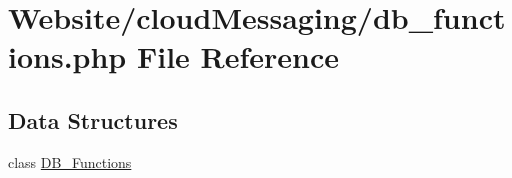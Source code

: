\hypertarget{db__functions_8php}{\section{Website/cloud\-Messaging/db\-\_\-functions.php File Reference}
\label{db__functions_8php}
}
\subsection*{Data Structures}
\begin{DoxyCompactItemize}
\item 
class \hyperlink{class_d_b___functions}{D\-B\-\_\-\-Functions}
\end{DoxyCompactItemize}
